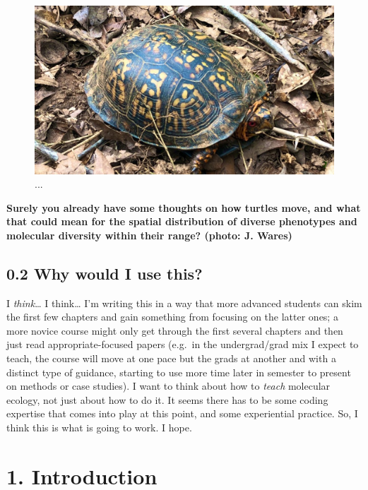 \documentclass[
]{article}
\begin{document}
\begin{figure}

{\centering \includegraphics[width=0.9\linewidth]{MEImages/IMG_1549} 

}

\caption{...}\label{fig:unnamed-chunk-1}
\end{figure}

\textbf{Surely you already have some thoughts on how turtles move, and
what that could mean for the spatial distribution of diverse phenotypes
and molecular diversity within their range? (photo: J. Wares)}

\hypertarget{why-would-i-use-this}{%
\subsection{0.2 Why would I use this?}\label{why-would-i-use-this}}

I \emph{think}\ldots{} I think\ldots{} I'm writing this in a way that
more advanced students can skim the first few chapters and gain
something from focusing on the latter ones; a more novice course might
only get through the first several chapters and then just read
appropriate-focused papers (e.g.~in the undergrad/grad mix I expect to
teach, the course will move at one pace but the grads at another and
with a distinct type of guidance, starting to use more time later in
semester to present on methods or case studies). I want to think about
how to \emph{teach} molecular ecology, not just about how to do it. It
seems there has to be some coding expertise that comes into play at this
point, and some experiential practice. So, I think this is what is going
to work. I hope.

\hypertarget{introduction}{%
\section{1. Introduction}\label{introduction}}
\end{document}

